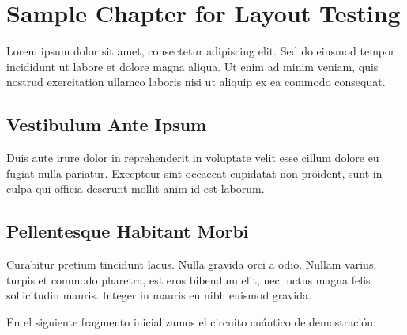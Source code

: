 \chapter{Sample Chapter for Layout Testing}

Lorem ipsum dolor sit amet, consectetur adipiscing elit. Sed do eiusmod tempor incididunt ut labore et dolore magna aliqua. Ut enim ad minim veniam, quis nostrud exercitation ullamco laboris nisi ut aliquip ex ea commodo consequat.

\section{Vestibulum Ante Ipsum}
Duis aute irure dolor in reprehenderit in voluptate velit esse cillum dolore eu fugiat nulla pariatur. Excepteur sint occaecat cupidatat non proident, sunt in culpa qui officia deserunt mollit anim id est laborum.

\section{Pellentesque Habitant Morbi}
Curabitur pretium tincidunt lacus. Nulla gravida orci a odio. Nullam varius, turpis et commodo pharetra, est eros bibendum elit, nec luctus magna felis sollicitudin mauris. Integer in mauris eu nibh euismod gravida.

En el siguiente fragmento inicializamos el circuito cuántico de demostración:

